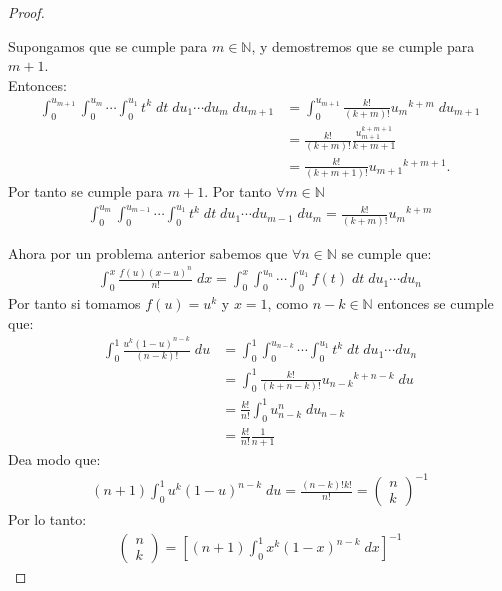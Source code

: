 \documentclass[11pt]{article}
\numberwithin{equation}{section}
\newcounter{problem}
\newcommand{\N}{\mathbb{N}}
\renewcommand{\k}{\hat{k}}
\begin{document}
\begin{proof}
\begin{box1}
    Supongamos que se cumple para $m\in\N$, y demostremos que se cumple para $m+1$. \\
    Entonces:
    \begin{align*}
        \int_{0}^{u_{m+1}}\int_{0}^{u_{m}}\cdots\int_{0}^{u_1}t^k\;dt\;du_1\cdots du_{m}\;du_{m+1}&=\int_{0}^{u_{m+1}}\frac{k!}{(k+m)!}{u_m}^{k+m}\;du_{m+1}\\
        &=\frac{k!}{(k+m)!}\frac{u_{m+1}^{k+m+1}}{k+m+1}\\
        &=\frac{k!}{(k+m+1)!}{u_{m+1}}^{k+m+1}.
    \end{align*}
Por tanto se cumple para $m+1$. Por tanto $\forall m\in\N$
    \begin{align*}
        \int_{0}^{u_m}\int_{0}^{u_{m-1}}\cdots\int_{0}^{u_1}t^k\;dt\;du_1\cdots du_{m-1}\;du_m=\frac{k!}{(k+m)!}{u_m}^{k+m} 
    \end{align*}
    \end{box1}
    \newpage
    Ahora por un problema anterior sabemos que $\forall n\in\N$ se cumple que:
    \begin{align*}
        \int_{0}^{x}\frac{f(u)(x-u)^n}{n!}\;dx=\int_{0}^{x}\int_{0}^{u_n}\cdots\int_{0}^{u_1}f(t)\;dt\;du_1\cdots du_{n}
    \end{align*}
    Por tanto si tomamos $f(u)=u^k$ y $x=1$, como $n-k\in\N$ entonces se cumple que:
    \begin{align*}
        \int_{0}^{1}\frac{u^k(1-u)^{n-k}}{(n-k)!}\;du&=\int_{0}^{1}\int_{0}^{u_{n-k}}\cdots\int_{0}^{u_1}t^k\;dt\;du_1\cdots du_{n}\\
        &=\int_{0}^{1}\frac{k!}{(k+n-k)!}{u_{n-k}}^{k+n-k}\;du\\
        &=\frac{k!}{n!}\int_{0}^{1}u_{n-k}^n\;du_{n-k}\\
        &=\frac{k!}{n!}\frac{1}{n+1}
    \end{align*}
    Dea modo que:
    \begin{align*}
        (n+1)\int_{0}^{1}{u^k(1-u)^{n-k}}\;du=\frac{(n-k)!k!}{n!}=\begin{pmatrix} n\\k \end{pmatrix}^{-1}
    \end{align*}
    Por lo tanto:
    \begin{align*}
        \begin{pmatrix}
           n\\
           k
        \end{pmatrix}
        =\left[(n+1)\int_{0}^{1}x^k(1-x)^{n-k}\;dx\right]^{-1}
   \end{align*}
\end{proof}
\end{document}
